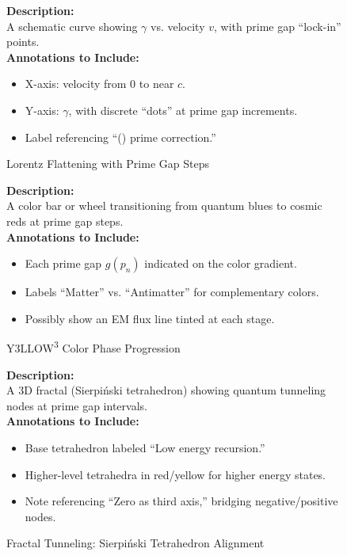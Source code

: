 \documentclass[11pt]{article}
\begin{document}
\begin{figure}[p]
\caption{Lorentz Flattening with Prime Gap Steps}
\label{fig:lorentzFlattening}
\textbf{Description:}\\
A schematic curve showing \(\gamma\) vs. velocity \(v\), with prime gap “lock-in” points.\\[0.5em]
\textbf{Annotations to Include:}
\begin{itemize}
    \item X-axis: velocity from 0 to near $c$.
    \item Y-axis: $\gamma$, with discrete “dots” at prime gap increments.
    \item Label referencing “(\oplus) prime correction.”
\end{itemize}
\end{figure}

\begin{figure}[p]
\caption{Y3LLOW\textsuperscript{3} Color Phase Progression}
\label{fig:colorPhases}
\textbf{Description:}\\
A color bar or wheel transitioning from quantum blues to cosmic reds at prime gap steps.\\[0.5em]
\textbf{Annotations to Include:}
\begin{itemize}
    \item Each prime gap $g(p_n)$ indicated on the color gradient.
    \item Labels “Matter” vs. “Antimatter” for complementary colors.
    \item Possibly show an EM flux line tinted at each stage.
\end{itemize}
\end{figure}

\begin{figure}[p]
\caption{Fractal Tunneling: Sierpi\'nski Tetrahedron Alignment}
\label{fig:fractalTunneling}
\textbf{Description:}\\
A 3D fractal (Sierpi\'nski tetrahedron) showing quantum tunneling nodes at prime gap intervals.\\[0.5em]
\textbf{Annotations to Include:}
\begin{itemize}
    \item Base tetrahedron labeled “Low energy recursion.”
    \item Higher-level tetrahedra in red/yellow for higher energy states.
    \item Note referencing “Zero as third axis,” bridging negative/positive nodes.
\end{itemize}
\end{figure}

\clearpage



\end{document}
